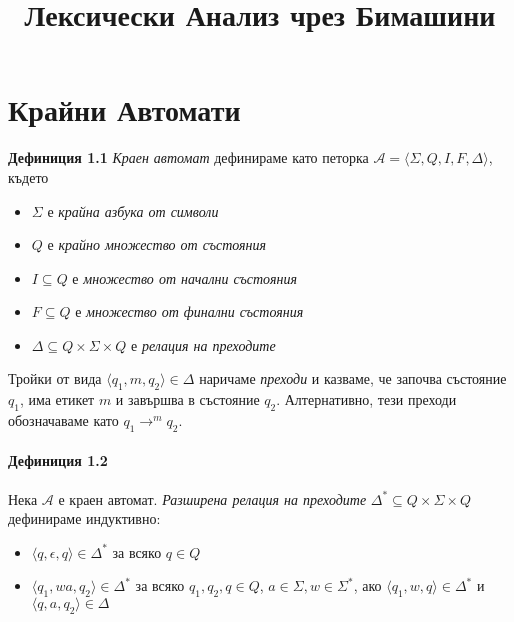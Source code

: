 \documentclass[11pt, oneside]{article}   	%
\title{Лексически Анализ чрез Бимашини}
\begin{document}

\section{Крайни Автомати}

\textbf{Дефиниция 1.1} \emph{Краен автомат} дефинираме като петорка \( \mathcal{A} = \langle \Sigma, Q, I, F, \Delta \rangle \), където

\begin{itemize}
	\item \( \Sigma \) е \emph{крайна азбука от символи}
	\item \( Q \) е \emph{крайно множество от състояния}
	\item \( I \subseteq Q \) е \emph{множество от начални състояния}
	\item \( F \subseteq Q \) е \emph{множество от финални състояния}
	\item \( \Delta \subseteq Q \times \Sigma \times Q \) е \emph{релация на преходите}
\end{itemize}
 
Тройки от вида \( \langle q_1, m, q_2 \rangle \in \Delta \) наричаме \emph{преходи} и казваме, че започва състояние \( q_1 \), има етикет \( m \) и завършва в състояние \( q_2 \). Алтернативно, тези преходи обозначаваме като \( q_1 \to^m q_2 \).

\paragraph{Дефиниция 1.2} Нека \( \mathcal{A} \) е краен автомат. \emph{Разширена релация на преходите} \( \Delta^* \subseteq Q \times \Sigma \times Q \) дефинираме индуктивно:

\begin{itemize}
	\item \( \langle q, \epsilon, q \rangle \in \Delta^* \) за всяко \( q \in Q \)
	\item \( \langle q_1, wa, q_2 \rangle \in \Delta^* \) за всяко \( q_1, q_2, q \in Q \), \( a \in \Sigma, w \in \Sigma^* \), ако \( \langle q_1, w, q \rangle \in \Delta^* \) и \( \langle q, a, q_2 \rangle \in \Delta \)
\end{itemize}
\end{document}
